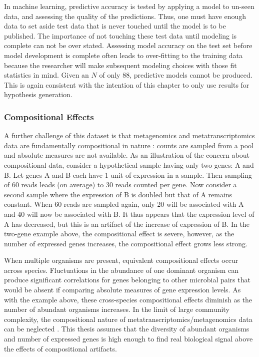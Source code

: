 In machine learning, predictive accuracy is tested by applying a model to un-seen data, and assessing the quality of the predictions.
Thus, one must have enough data to set aside test data that is never touched until the model is to be published.
The importance of not touching these test data until modeling is complete can not be over stated.
Assessing model accuracy on the test set before model development is complete often leads to over-fitting to the training data because the researcher will make subsequent modeling choices with those fit statistics in mind.
Given an $N$ of only 88, predictive models cannot be produced.
This is again consistent with the intention of this chapter to only use results for hypothesis generation.

\subsubsection{Compositional Effects}
A further challenge of this dataset is that metagenomics and metatranscriptomics data are fundamentally compositional in nature \cite{tsilimigras2016, aitchison1982}: counts are sampled from a pool and absolute measures are not available.
As an illustration of the concern about compositional data, consider a hypothetical sample having only two genes: A and B.
Let genes A and B each have 1 unit of expression in a sample.
Then sampling of 60 reads leads (on average) to 30 reads counted per gene.
Now consider a second sample where the expression of B is doubled but that of A remains constant.
When 60 reads are sampled again, only 20 will be associated with A and 40 will now be associated with B.
It thus appears that the expression level of A has decreased, but this is an artifact of the increase of expression of B.
In the two-gene example above, the compositional effect is severe, however, as the number of expressed genes increases, the compositional effect grows less strong.

When multiple organisms are present, equivalent compositional effects occur across species.
Fluctuations in the abundance of one dominant organism can produce significant correlations for genes belonging to other microbial pairs that would be absent if comparing absolute measures of gene expression levels.
As with the example above, these cross-species compositional effects diminish as the number of abundant organisms increases.
In the limit of large community complexity, the compositional nature of metatranscriptomics/metagenomics data can be neglected \cite{tsilimigras2016}.
This thesis assumes that the diversity of abundant organisms and number of expressed genes is high enough to find real biological signal above the effects of compositional artifacts.

